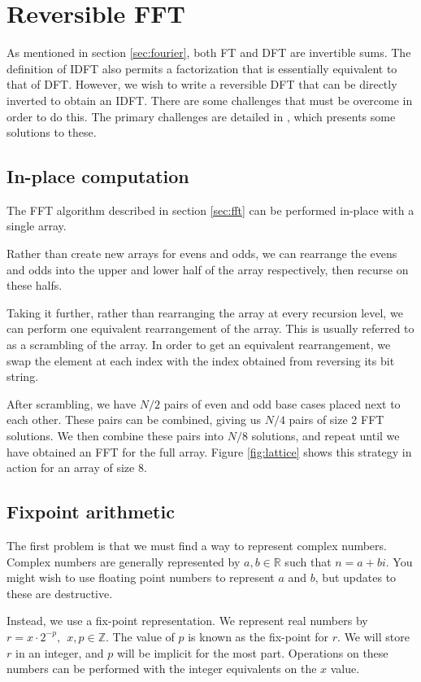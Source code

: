 \section{Reversible FFT}
As mentioned in section \ref{sec:fourier},
both FT and DFT are invertible sums.
The definition of IDFT also permits a factorization that is essentially equivalent to that of DFT.
However, we wish to write a reversible DFT that can be directly inverted to obtain an IDFT.
There are some challenges that must be overcome in order to do this.
The primary challenges are detailed in \cite{intfft},
which presents some solutions to these.

\subsection{In-place computation}
The FFT algorithm described in section \ref{sec:fft} can be performed in-place with a single array.

Rather than create new arrays for evens and odds,
we can rearrange the evens and odds into the upper and lower half of the array respectively,
then recurse on these halfs.

Taking it further, rather than rearranging the array at every recursion level,
we can perform one equivalent rearrangement of the array.
This is usually referred to as a scrambling of the array.
In order to get an equivalent rearrangement,
we swap the element at each index with the index obtained from reversing its bit string.

After scrambling,
we have $N/2$ pairs of even and odd base cases placed next to each other.
These pairs can be combined, giving us $N/4$ pairs of size 2 FFT solutions.
We then combine these pairs into $N/8$ solutions,
and repeat until we have obtained an FFT for the full array.
Figure \ref{fig:lattice} shows this strategy in action for an array of size 8.



\subsection{Fixpoint arithmetic}
The first problem is that we must find a way to represent complex numbers.
Complex numbers are generally represented by $a, b \in \mathbb{R}$ such that $n = a + bi$.
You might wish to use floating point numbers to represent $a$ and $b$,
but updates to these are destructive.

Instead, we use a fix-point representation.
We represent real numbers by $r = x \cdot 2^{-p},~~ x, p \in \mathbb{Z}$.
The value of $p$ is known as the fix-point for $r$.
We will store $r$ in an integer, and $p$ will be implicit for the most part.
Operations on these numbers can be performed with the integer equivalents on the $x$ value.

